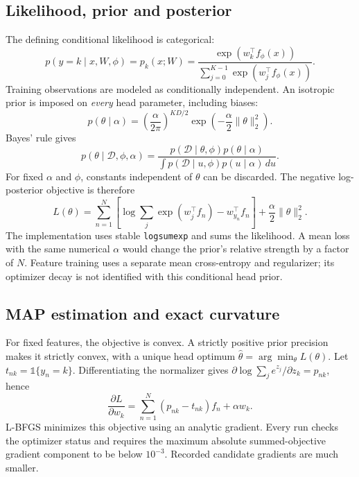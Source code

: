 \documentclass[10pt,a4paper]{article}
\begin{document}
\subsection{Likelihood, prior and posterior}
The defining conditional likelihood is categorical:
\begin{equation}
p(y=k\mid x,W,\phi)=p_k(x;W)
=\frac{\exp(w_k^\top f_\phi(x))}
{\sum_{j=0}^{K-1}\exp(w_j^\top f_\phi(x))}.
\end{equation}
Training observations are modeled as conditionally independent.
An isotropic prior is imposed on \emph{every} head parameter, including biases:
\begin{equation}
p(\theta\mid\alpha)=
\left(\frac{\alpha}{2\pi}\right)^{KD/2}
\exp\left(-\frac{\alpha}{2}\|\theta\|_2^2\right).
\end{equation}
Bayes' rule gives
\begin{equation}
p(\theta\mid\mathcal D,\phi,\alpha)
=\frac{p(\mathcal D\mid\theta,\phi)p(\theta\mid\alpha)}
{\int p(\mathcal D\mid u,\phi)p(u\mid\alpha)\,du}.
\end{equation}
For fixed $\alpha$ and $\phi$, constants independent of $\theta$ can be discarded.
The negative log-posterior objective is therefore
\begin{equation}\label{eq:objective}
L(\theta)=\sum_{n=1}^N
\left[\log\sum_j\exp(w_j^\top f_n)-w_{y_n}^\top f_n\right]
+\frac{\alpha}{2}\|\theta\|_2^2 .
\end{equation}
The implementation uses stable \texttt{logsumexp} and sums the likelihood.
A mean loss with the same numerical $\alpha$ would change the prior's
relative strength by a factor of $N$. Feature training uses a separate
mean cross-entropy and regularizer; its optimizer decay is not
identified with this conditional head prior.


\subsection{MAP estimation and exact curvature}
For fixed features, the objective is convex. A strictly positive prior precision
makes it strictly convex, with a unique head optimum
$\hat\theta=\arg\min_\theta L(\theta)$.
Let $t_{nk}=\mathbb{1}\{y_n=k\}$. Differentiating the normalizer gives
$\partial\log\sum_j e^{z_j}/\partial z_k=p_{nk}$, hence
\begin{equation}
\frac{\partial L}{\partial w_k}
=\sum_{n=1}^N(p_{nk}-t_{nk})f_n+\alpha w_k .
\end{equation}
L-BFGS minimizes this objective using an analytic gradient. Every run checks the
optimizer status and requires the maximum absolute summed-objective gradient
component to be below $10^{-3}$. Recorded candidate gradients are much smaller.
\end{document}
